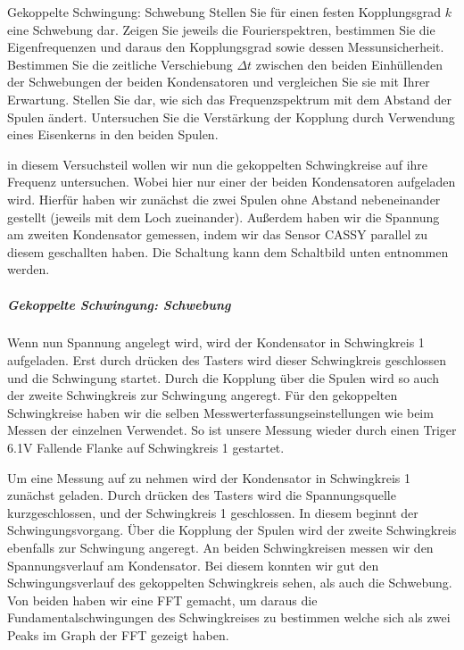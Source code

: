 \documentclass[twoside]{protokoll}
\begin{document}
\begin{aufgabe}{Gekoppelte Schwingung: Schwebung}
  Stellen Sie für einen festen Kopplungsgrad $k$ eine Schwebung
  dar. Zeigen Sie jeweils die Fourierspektren, bestimmen Sie die
  Eigenfrequenzen und daraus den Kopplungsgrad sowie dessen
  Messunsicherheit. Bestimmen Sie die zeitliche Verschiebung
  $\Delta{}t$ zwischen den beiden Einhüllenden der Schwebungen der
  beiden Kondensatoren und vergleichen Sie sie mit Ihrer
  Erwartung. Stellen Sie dar, wie sich das Frequenzspektrum mit dem
  Abstand der Spulen ändert. Untersuchen Sie die Verstärkung der
  Kopplung durch Verwendung eines Eisenkerns in den beiden Spulen.
\end{aufgabe}

in diesem Versuchsteil wollen wir nun die gekoppelten Schwingkreise auf ihre Frequenz untersuchen. Wobei hier nur einer der beiden Kondensatoren aufgeladen wird.
Hierfür haben wir zunächst die zwei Spulen ohne Abstand nebeneinander gestellt (jeweils mit dem Loch zueinander). 
Außerdem haben wir die Spannung am zweiten Kondensator gemessen, indem wir das Sensor CASSY parallel zu diesem geschallten haben. 
Die Schaltung kann dem Schaltbild unten entnommen werden. \\



\subparagraph{Gekoppelte Schwingung: Schwebung}


Wenn nun Spannung angelegt wird, wird der Kondensator in Schwingkreis 1 aufgeladen. 
Erst durch drücken des Tasters wird dieser Schwingkreis geschlossen und die Schwingung startet. 
Durch die Kopplung über die Spulen wird so auch der zweite Schwingkreis zur Schwingung angeregt.
Für den gekoppelten Schwingkreise haben wir die selben Messwerterfassungseinstellungen wie beim Messen der einzelnen Verwendet. 
So ist unsere Messung wieder durch einen Triger 6.1V Fallende Flanke auf Schwingkreis 1 gestartet.

Um eine Messung auf zu nehmen wird der Kondensator in Schwingkreis 1 zunächst geladen.
Durch drücken des Tasters wird die Spannungsquelle kurzgeschlossen, und der Schwingkreis 1 geschlossen. In diesem beginnt der Schwingungsvorgang.
Über die Kopplung der Spulen wird der zweite Schwingkreis ebenfalls zur Schwingung angeregt. An beiden Schwingkreisen messen wir den Spannungsverlauf am Kondensator. 
Bei diesem konnten wir gut den Schwingungsverlauf des gekoppelten Schwingkreis sehen, als auch die Schwebung. 
Von beiden haben wir eine FFT gemacht, um daraus die Fundamentalschwingungen des Schwingkreises zu bestimmen welche sich als zwei Peaks im Graph der FFT gezeigt haben.\\ 
\end{document}
